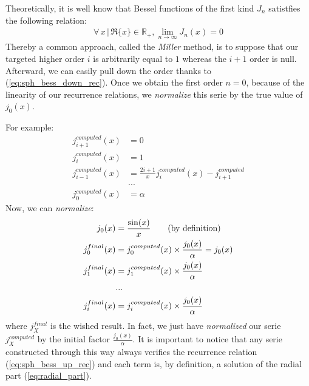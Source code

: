 \documentclass{article}
\numberwithin{equation}{section}
\begin{document}
Theoretically, it is well know that Bessel functions of the first kind $J_{n}$ satistfies the following relation:
\begin{align}
\forall\,x\,|\,\Re\{x\} \in\mathbb{R}_{+}, \lim_{n \to \infty } J_{n}(x)=0
\end{align}
Thereby a common approach, called the \textit{Miller} method, is to suppose that our targeted higher order $i$ is arbitrarily equal to $1$ whereas the $i+1$ order is null. Afterward, we can easily pull down the order thanks to (\ref{eq:sph_bess_down_rec}). Once we obtain the first order $n=0$, because of the linearity of our recurrence relations, we \textit{normalize} this serie by the true value of $j_{0}(x)$. 

For example:
\begin{equation}\label{eq:j_computed}
\begin{aligned}
j^{computed}_{i+1}(x) &= 0\\
j^{computed}_{i}(x) &= 1\\
j^{computed}_{i-1}(x) &= \frac{2i+1}{x}j^{computed}_{i}(x) - j^{computed}_{i+1}\\
&...\\
j^{computed}_{0}(x) &= \alpha
\end{aligned}
\end{equation}
Now, we can \textit{normalize}:
\begin{equation}\label{eq:j_final}
\begin{aligned}
j_{0}(x) &= \frac{\sin(x)}{x} \qquad\textnormal{(by definition)}\\
j^{final}_{0}(x) &= j^{computed}_{0}(x) \times \frac{j_{0}(x)}{\alpha} = j_{0}(x)\\
j^{final}_{1}(x) &= j^{computed}_{1}(x) \times \frac{j_{0}(x)}{\alpha}\\
&...\\
j^{final}_{i}(x) &= j^{computed}_{i}(x) \times \frac{j_{0}(x)}{\alpha}\\
\end{aligned}
\end{equation}
where $j^{final}_{X}$ is the wished result. In fact, we just have \textit{normalized} our serie $j^{computed}_{X}$ by the initial factor $\frac{j_{0}(x)}{\alpha}$. It is important to notice that any serie constructed through this way always verifies the recurrence relation (\ref{eq:sph_bess_up_rec}) and each term is, by definition, a solution of the radial part (\ref{eq:radial_part}).
\end{document}
